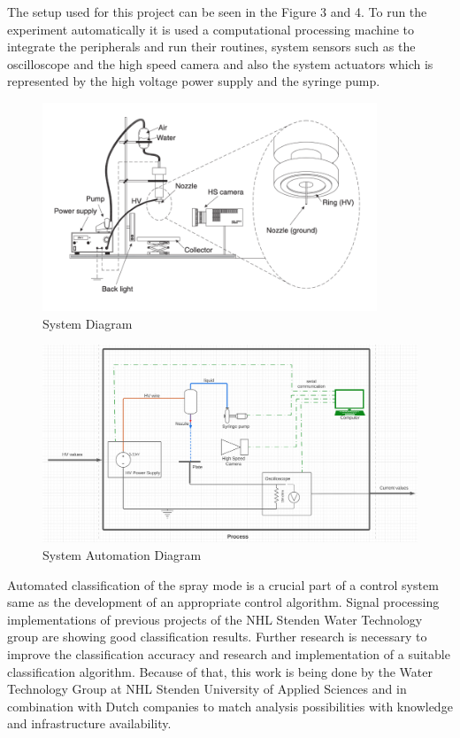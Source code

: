 The setup used for this project can be seen in the Figure 3 and 4. To run the experiment automatically it is used a computational processing machine to integrate the peripherals and run their routines, system sensors such as the oscilloscope and the high speed camera 
and also the system actuators which is represented by the high voltage power supply and the syringe pump. 

\begin{figure}[H]
    \center
    \includegraphics[width=10cm]{images/system_setup.png}
    \caption{System Diagram}
\end{figure}

\begin{figure}[H]
    \center
    \includegraphics[width=14cm]{images/system-design.png}
    \caption{System Automation Diagram}
\end{figure}


Automated classification of the spray mode is a crucial part of a control system same as the development of an appropriate control algorithm. 
Signal processing implementations of previous projects of the NHL Stenden Water Technology group are showing good classification results.
Further research is necessary to improve the classification accuracy and research and implementation of a suitable classification algorithm. 
Because of that, this work is being done by the Water Technology Group at NHL Stenden University of Applied Sciences and in combination with Dutch companies to match analysis possibilities with knowledge and infrastructure availability.




